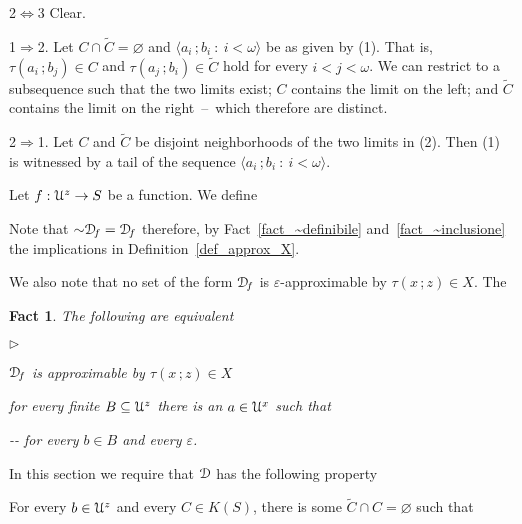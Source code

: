 \documentclass{amsproc}
\makeatletter
\newcommand{\mylabel}[1]{{#1}\hfill}
\renewenvironment{itemize}
  {\begin{list}{$\triangleright$}{%
  \setlength{\parskip}{0mm}
  \setlength{\topsep}{.1\baselineskip}
  \setlength{\rightmargin}{0mm}
  \setlength{\listparindent}{0mm}
  \setlength{\itemindent}{0mm}
  \setlength{\labelwidth}{3ex}
  \setlength{\itemsep}{.1\baselineskip}
  \setlength{\parsep}{.1\baselineskip}
  \setlength{\partopsep}{0mm}
  \setlength{\labelsep}{1ex}
  \setlength{\leftmargin}{\labelwidth+\labelsep}
  \let\makelabel\mylabel}}{%
\end{list}}
\newcounter{thm}
\theoremstyle{mio}
\newtheorem{fact}[thm]{Fact}\tcolorboxenvironment{fact}{mythm}
\providecommand{\proofNameStyle}{\bfseries}
\renewenvironment{proof}[1][\proofname]{\par
  \pushQED{\qed}%
  \normalfont%
  \trivlist
  \item[\hskip\labelsep
        \proofNameStyle
    #1\@addpunct{.}]\ignorespaces
}{%
  \popQED\endtrivlist\@endpefalse
}
\makeatother
\begin{document}
\begin{proof}
  2$\Leftrightarrow$3 Clear.

  1$\Rightarrow$2.
  Let $C\cap\tilde C=\varnothing$ and $\langle a_i\,;b_i\ :\ i<\omega\rangle$ be as given by (1).
  That is, $\tau(a_i\,;b_j)\in C$ and $\tau(a_j\,;b_i)\in \tilde C$ hold for every $i<j<\omega$.
  We can restrict to a subsequence such that the two limits exist; $C$ contains the limit on the left; and $\tilde C$ contains the limit on the right~--~which therefore are distinct.%

  2$\Rightarrow$1. Let $C$ and $\tilde C$ be disjoint neighborhoods of the two limits in (2).
  Then (1) is witnessed by a tail of the sequence $\langle a_i\,;b_i\ :\ i<\omega\rangle$.
\end{proof}


Let $f:{\EuScript U}^{z}\to S$ be a function.
We define


Note that ${\sim}{\EuScript D\!}_f={\EuScript D\!}_f$ therefore, by Fact~\ref{fact_~definibile} and~\ref{fact_~inclusione} the implications in Definition~\ref{def_approx_X}.

We also note that no set of the form ${\EuScript D\!}_f$ is $\varepsilon$-approximable by $\tau(x\,;z)\in X$.
The 

\begin{fact}
  The following are equivalent
  \begin{itemize}
    \item [1] ${\EuScript D\!}_f$ is approximable by $\tau(x\,;z)\in X$
    \item [2] for every finite $B\subseteq{\EuScript U}^{z}$ there is an $a\in{\EuScript U}^{x}$ such that\smallskip
    
    \noindent\kern-\kern-
    \hfill for every $b\in B$ and every $\varepsilon$.
  \end{itemize}
  
\end{fact}

In this section we require that ${\EuScript D}$ has the following property

For every $b\in{\EuScript U}^z$ and every $C\in K(S)$, there is some $\tilde C\cap C=\varnothing$ such that
\end{document}
